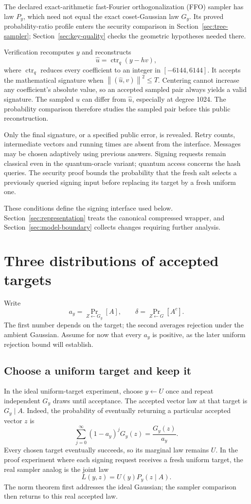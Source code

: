 \documentclass[11pt,a4paper]{article}
\newcommand{\norm}[1]{\left\lVert#1\right\rVert}
\theoremstyle{definition}
\theoremstyle{remark}
\numberwithin{equation}{section}
\begin{document}
The declared exact-arithmetic fast-Fourier orthogonalization (FFO) sampler
has law $P_y$, which need not equal the exact coset-Gaussian law $G_y$. Its proved probability-ratio profile
enters the security comparison in Section~\ref{sec:tree-sampler};
Section~\ref{sec:key-quality} checks the geometric hypotheses needed there.

Verification recomputes $y$ and reconstructs
\[
 \widehat u=\operatorname{ctr}_q(y-hv),
\]
where $\operatorname{ctr}_q$ reduces every coefficient to an integer in
$[-6144,6144]$. It accepts the mathematical signature when
$\norm{(\widehat u,v)}^2\le T$. Centering cannot increase any coefficient's
absolute value, so an accepted sampled pair always yields a valid signature.
The sampled $u$ can differ from $\widehat u$, especially at degree 1024.
The probability comparison therefore studies the sampled pair before this
public reconstruction.

Only the final signature, or a specified public error, is revealed. Retry
counts, intermediate vectors and running times are absent from the interface.
Messages may be chosen adaptively using previous answers. Signing requests
remain classical even in the quantum-oracle variant; quantum access concerns
the hash queries. The security proof bounds the probability that the fresh salt selects a
previously queried signing input before replacing its target by a fresh
uniform one.

These conditions define the signing interface used below.
Section~\ref{sec:representation} treats the canonical compressed wrapper,
and Section~\ref{sec:model-boundary} collects changes requiring further analysis.

\section{Three distributions of accepted targets}
\label{sec:three-laws}

Write
\[
 a_y=\Pr_{Z\leftarrow G_y}[A],
 \qquad
 \delta=\Pr_{Z\leftarrow G}[A^c].
\]
The first number depends on the target; the second averages rejection under
the ambient Gaussian. Assume for now that every $a_y$ is positive, as the
later uniform rejection bound will establish.

\subsection{Choose a uniform target and keep it}

In the ideal uniform-target experiment, choose $y\leftarrow U$ once and
repeat independent $G_y$ draws until acceptance. The accepted vector law at
that target is $G_y\mid A$. Indeed, the probability of eventually returning
a particular accepted vector $z$ is
\[
 \sum_{j=0}^{\infty}(1-a_y)^jG_y(z)
 =\frac{G_y(z)}{a_y}.
\]
Every chosen target eventually succeeds, so its marginal law remains $U$.
In the proof experiment where each signing request receives a fresh uniform
target, the real sampler analog is the joint law
\[
 L(y,z)=U(y)P_y(z\mid A).
\]
The norm theorem first addresses the ideal Gaussian; the sampler comparison
then returns to this real accepted law.
\end{document}
